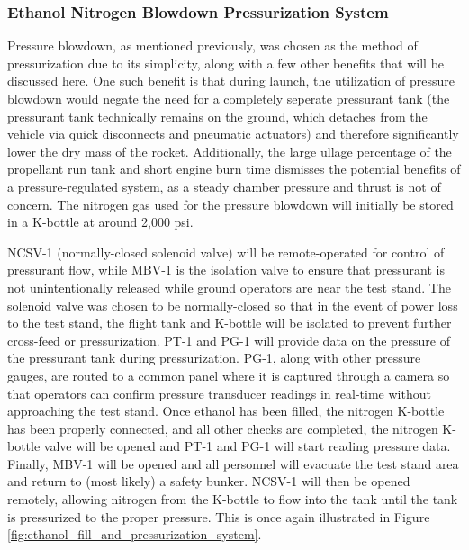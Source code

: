 \documentclass[9pt]{article} %
\numberwithin{equation}{section} %
\begin{document}
\subsubsection{Ethanol Nitrogen Blowdown Pressurization System}
\hspace{\parindent} Pressure blowdown, as mentioned previously, was chosen as the method of pressurization due to its simplicity, along with a few other benefits that will be discussed here. One such benefit is that during launch, the utilization of pressure blowdown would negate the need for a completely seperate pressurant tank (the pressurant tank technically remains on the ground, which detaches from the vehicle via quick disconnects and pneumatic actuators) and therefore significantly lower the dry mass of the rocket. Additionally, the large ullage percentage of the propellant run tank and short engine burn time dismisses the potential benefits of a pressure-regulated system, as a steady chamber pressure and thrust is not of concern. The nitrogen gas used for the pressure blowdown will initially be stored in a K-bottle at around 2,000 psi.

NCSV-1 (normally-closed solenoid valve) will be remote-operated for control of pressurant flow, while MBV-1 is the isolation valve to ensure that pressurant is not unintentionally released while ground operators are near the test stand. The solenoid valve was chosen to be normally-closed so that in the event of power loss to the test stand, the flight tank and K-bottle will be isolated to prevent further cross-feed or pressurization. PT-1 and PG-1 will provide data on the pressure of the pressurant tank during pressurization. PG-1, along with other pressure gauges, are routed to a common panel where it is captured through a camera so that operators can confirm pressure transducer readings in real-time without approaching the test stand. Once ethanol has been filled, the nitrogen K-bottle has been properly connected, and all other checks are completed, the nitrogen K-bottle valve will be opened and PT-1 and PG-1 will start reading pressure data. Finally, MBV-1 will be opened and all personnel will evacuate the test stand area and return to (most likely) a safety bunker. NCSV-1 will then be opened remotely, allowing nitrogen from the K-bottle to flow into the tank until the tank is pressurized to the proper pressure. This is once again illustrated in Figure \ref{fig:ethanol_fill_and_pressurization_system}.
\end{document}
